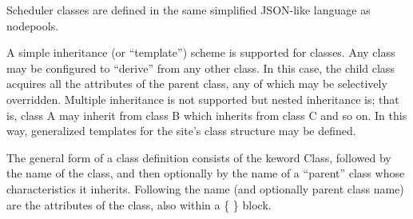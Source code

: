     Scheduler classes are defined in the same simplified JSON-like language as
    nodepools.

    A simple inheritance (or ``template'') scheme is supported for classes.  Any
    class may be configured to ``derive'' from any other class.  In this case, the
    child class acquires all the attributes of the parent class, any of which may
    be selectively overridden.  Multiple inheritance is not supported but
    nested inheritance is; that is, class A may inherit from class B which inherits
    from class C and so on. In this way, generalized templates for the site's
    class structure may be defined.  

    The general form of a class definition consists of the keword Class, followed
    by the name of the class, and then optionally by the name of a ``parent'' class
    whose characteristics it inherits.   Following the name (and optionally parent class
    name) are the attributes of the class, also within a \{ \} block.

